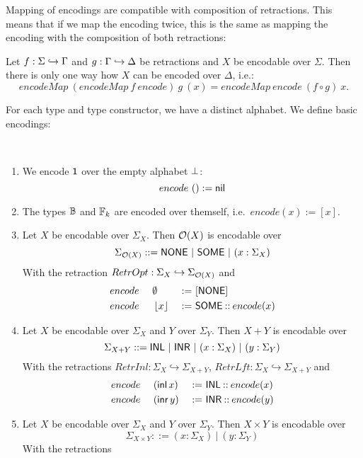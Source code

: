 Mapping of encodings are compatible with composition of retractions.  This means that if we map the encoding twice, this is the same as mapping the
encoding with the composition of both retractions:
\begin{lemma}
  \label{lem:Encode_map_comp}
  Let $f : \Sigma \hookrightarrow \Gamma$ and $g : \Gamma \hookrightarrow \Delta$ be retractions and $X$ be encodable over $\Sigma$.  Then there is only
  one way how $X$ can be encoded over $\Delta$, i.e.:
  \[ encodeMap~(encodeMap~f~encode)~g~(x) = encodeMap~encode~(f \circ g)~x. \]
\end{lemma}

For each type and type constructor, we have a distinct alphabet.  We define basic encodings:
\begin{definition}
  \label{def:basic-encodings}
  ~
  \begin{enumerate}
  \item We encode $\mathsf{1}$ over the empty alphabet $\bot$:
  \[ encode~\mathsf{()} := \mathsf{nil}
  \]
  \item The types $\mathbb{B}$ and $\mathbb{F}_k$ are encoded over themself, i.e.\ $encode(x):=[x]$.
  \item Let $X$ be encodable over $\Sigma_X$.  Then $\mathcal{O}(X)$ is encodable over
    \[ \Sigma_{\mathcal{O}(X)} ::= \mathsf{NONE} ~|~ \mathsf{SOME} ~|~ (x:\Sigma_X) \]
    With the retraction $RetrOpt : \Sigma_X \hookrightarrow \Sigma_{\mathcal{O}(X)}$ and
    \begin{alignat*}{3}
      &encode~&&\emptyset  &~:=~& [\mathsf{NONE}] \\
      &encode~&&\left\lfloor {x} \right\rfloor&~:=~& \mathsf{SOME} \mathbin{::} encode(x)
    \end{alignat*}
  \item Let $X$ be encodable over $\Sigma_X$ and $Y$ over $\Sigma_Y$.  Then $X+Y$ is encodable over
    \[ \Sigma_{X+Y} ::= \mathsf{INL} ~|~ \mathsf{INR} ~|~ (x:\Sigma_X) ~|~ (y:\Sigma_Y) \] With the retractions
    $RetrInl : \Sigma_X \hookrightarrow \Sigma_{X+Y}$, $RetrLft : \Sigma_X \hookrightarrow \Sigma_{X+Y}$ and
    \begin{alignat*}{3}
      &encode~&&(\operatorname{\mathsf{inl}} x)&~:=~& \mathsf{INL} \mathbin{::} encode(x) \\
      &encode~&&(\operatorname{\mathsf{inr}} y)&~:=~& \mathsf{INR} \mathbin{::} encode(y)
    \end{alignat*}
  \item Let $X$ be encodable over $\Sigma_X$ and $Y$ over $\Sigma_Y$.  Then $X \times Y$ is encodable over
    \[ \Sigma_{X \times Y} ::= (x:\Sigma_X) ~|~ (y:\Sigma_Y) \] With the retractions

\end{enumerate}
\end{definition}
